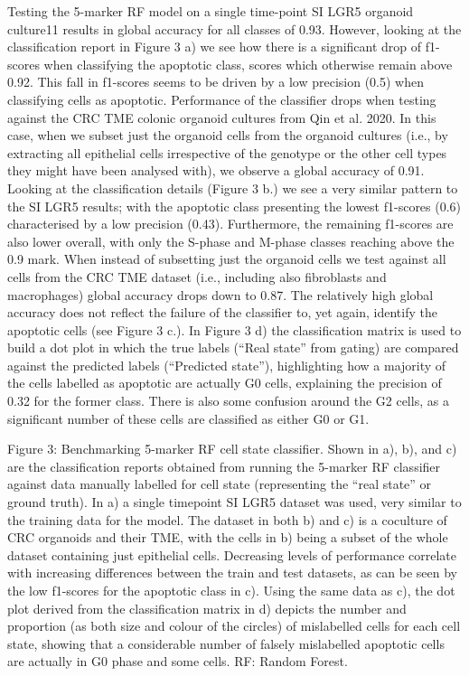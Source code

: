 Testing the 5-marker RF model on a single time-point SI LGR5 organoid culture11 results in global accuracy for all classes of 0.93. However, looking at the classification report in Figure 3 a) we see how there is a significant drop of f1-scores when classifying the apoptotic class, scores which otherwise remain above 0.92. This fall in f1-scores seems to be driven by a low precision (0.5) when classifying cells as apoptotic.
Performance of the classifier drops when testing against the CRC TME colonic organoid cultures from Qin et al. 2020. In this case, when we subset just the organoid cells from the organoid cultures (i.e., by extracting all epithelial cells irrespective of the genotype or the other cell types they might have been analysed with), we observe a global accuracy of 0.91. Looking at the classification details (Figure 3 b.) we see a very similar pattern to the SI LGR5 results; with the apoptotic class presenting the lowest f1-scores (0.6) characterised by a low precision (0.43). Furthermore, the remaining f1-scores are also lower overall, with only the S-phase and M-phase classes reaching above the 0.9 mark.
When instead of subsetting just the organoid cells we test against all cells from the CRC TME dataset (i.e., including also fibroblasts and macrophages) global accuracy drops down to 0.87. The relatively high global accuracy does not reflect the failure of the classifier to, yet again, identify the apoptotic cells (see Figure 3 c.). In Figure 3 d) the classification matrix is used to build a dot plot in which the true labels (“Real state” from gating) are compared against the predicted labels (“Predicted state”), highlighting how a majority of the cells labelled as apoptotic are actually G0 cells, explaining the precision of 0.32 for the former class. There is also some confusion around the G2 cells, as a significant number of these cells are classified as either G0 or G1.
 
Figure 3: Benchmarking 5-marker RF cell state classifier. Shown in a), b), and c) are the classification reports obtained from running the 5-marker RF classifier against data manually labelled for cell state (representing the “real state” or ground truth). In a) a single timepoint SI LGR5 dataset was used, very similar to the training data for the model. The dataset in both b) and c) is a coculture of CRC organoids and their TME, with the cells in b) being a subset of the whole dataset containing just epithelial cells. Decreasing levels of performance correlate with increasing differences between the train and test datasets, as can be seen by the low f1-scores for the apoptotic class in c). Using the same data as c), the dot plot derived from the classification matrix in d) depicts the number and proportion (as both size and colour of the circles) of mislabelled cells for each cell state, showing that a considerable number of falsely mislabelled apoptotic cells are actually in G0 phase and some cells. RF: Random Forest.



